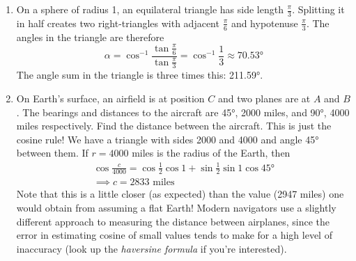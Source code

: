 \begin{enumerate}
	\item On a sphere of radius 1, an equilateral triangle has side length $\frac\pi 3$. Splitting it in half creates two right-triangles with adjacent $\frac\pi 6$ and hypotenuse $\frac\pi 3$. The angles in the triangle are therefore
	\[
		\alpha=\cos^{-1}\frac{\tan\frac\pi 6}{\tan\frac\pi 3}=\cos^{-1}\frac 13\approx \ang{70.53}
	\]
	The angle sum in the triangle is three times this: \ang{211.59}.
	
	\item On Earth's surface, an airfield is at position $C$ and two planes are at $A$ and $B$. The bearings and distances to the aircraft are \ang{45}, 2000 miles, and \ang{90}, 4000 miles respectively. Find the distance between the aircraft.\smallbreak
	This is just the cosine rule! We have a triangle with sides 2000 and 4000 and angle \ang{45} between them. If $r=4000$ miles is the radius of the Earth, then
	\begin{gather*}
		\cos\frac c{4000}=\cos\frac 1{2}\cos 1+\sin\frac 12\sin 1\cos\ang{45}\\
		\implies c=2833\text{ miles}
	\end{gather*}
	Note that this is a little closer (as expected) than the value (2947 miles) one would obtain from assuming a flat Earth!\smallbreak
	Modern navigators use a slightly different approach to measuring the distance between airplanes, since the error in estimating cosine of small values tends to make for a high level of inaccuracy (look up the \emph{haversine formula} if you're interested).
\end{enumerate}



